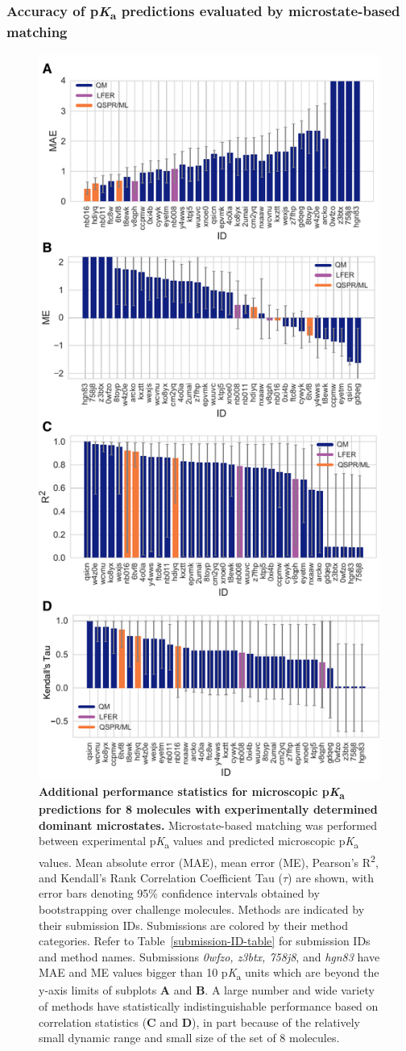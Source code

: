 \documentclass[9pt,lineno,final]{elife}
\newcommand{\pKa}{p\textit{K}\textsubscript{a}}
\begin{document}
\subsubsection{Accuracy of \pKa{} predictions evaluated by microstate-based matching}

\begin{figure}
\centering
\includegraphics[width=0.5\linewidth]{figures/typeI_statistics.pdf}
\caption{{\bf Additional performance statistics for microscopic \pKa{} predictions for 8 molecules with experimentally determined dominant microstates.} 
Microstate-based matching was performed between experimental \pKa{} values and predicted microscopic \pKa{}~ values. 
Mean absolute error (MAE), mean error (ME), Pearson’s R\textsuperscript{2}, and Kendall’s Rank Correlation Coefficient Tau ($\tau$) are shown, with error bars denoting 95\% confidence intervals obtained by bootstrapping over challenge molecules. 
Methods are indicated by their submission IDs. 
Submissions are colored by their method categories. 
Refer to Table~\ref{submission-ID-table} for submission IDs and method names. Submissions \textit{0wfzo, z3btx, 758j8}, and \textit{hgn83} have MAE and ME values bigger than 10 \pKa{} units which are beyond the y-axis limits of subplots {\bf A} and {\bf B}. 
A large number and wide variety of methods have statistically indistinguishable performance based on correlation statistics ({\bf C} and {\bf D}), in part because of the relatively small dynamic range and small size of the set of 8 molecules.
}
\label{fig:typeI-statistics}
\end{figure}
\end{document}
